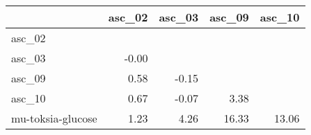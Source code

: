 \begin{tabular}{lrrrr}
\toprule
 & asc_02 & asc_03 & asc_09 & asc_10 \\
\midrule
asc_02 &  &  &  &  \\
asc_03 & -0.00 &  &  &  \\
asc_09 & 0.58 & -0.15 &  &  \\
asc_10 & 0.67 & -0.07 & 3.38 &  \\
mu-toksia-glucose & 1.23 & 4.26 & 16.33 & 13.06 \\
\bottomrule
\end{tabular}
